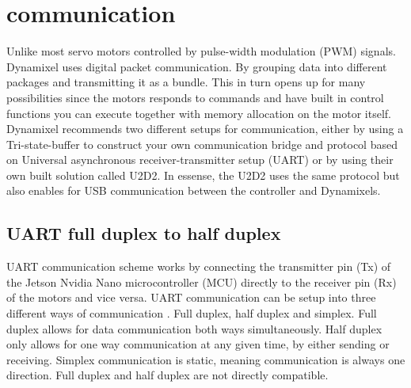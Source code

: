 \section*{communication}
Unlike most servo motors controlled by pulse-width modulation (PWM) signals.
Dynamixel uses digital packet communication.
By grouping data into different packages and transmitting it as a bundle.
This in turn opens up for many possibilities since the motors responds to commands and have built in control functions you can execute together with memory allocation on the motor itself.
Dynamixel recommends two different setups for communication,
either by using a Tri-state-buffer to construct your own communication bridge and protocol based on Universal asynchronous receiver-transmitter setup (UART) or by using their own built solution called U2D2.
In essense, the U2D2 uses the same protocol but also enables for USB communication between the controller and Dynamixels\cite{robotis}.

\subsection{UART full duplex to half duplex}
UART communication scheme works by connecting the transmitter pin (Tx) of the Jetson Nvidia Nano microcontroller (MCU)
directly to the receiver pin (Rx) of the motors and vice versa.
UART communication can be setup into three different ways of communication \cite{duplex}.
Full duplex, half duplex and simplex.
Full duplex allows for data communication both ways simultaneously.
Half duplex only allows for one way communication at any given time, by either sending or receiving.
Simplex communication is static, meaning communication is always one direction.
\newline
Full duplex and half duplex are not directly compatible.



